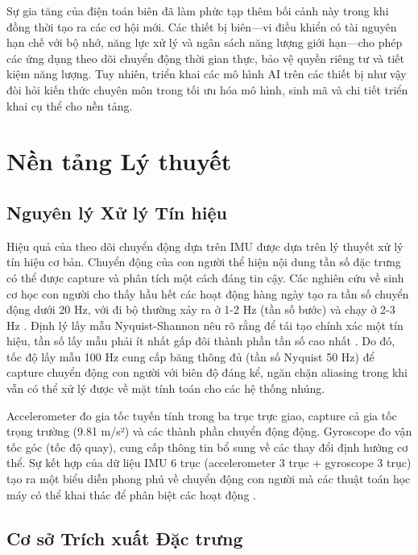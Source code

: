 Sự gia tăng của điện toán biên đã làm phức tạp thêm bối cảnh này trong khi đồng thời tạo ra các cơ hội mới. Các thiết bị biên—vi điều khiển có tài nguyên hạn chế với bộ nhớ, năng lực xử lý và ngân sách năng lượng giới hạn—cho phép các ứng dụng theo dõi chuyển động thời gian thực, bảo vệ quyền riêng tư và tiết kiệm năng lượng. Tuy nhiên, triển khai các mô hình AI trên các thiết bị như vậy đòi hỏi kiến thức chuyên môn trong tối ưu hóa mô hình, sinh mã và chi tiết triển khai cụ thể cho nền tảng.

\section{Nền tảng Lý thuyết}

\subsection{Nguyên lý Xử lý Tín hiệu}

Hiệu quả của theo dõi chuyển động dựa trên IMU được dựa trên lý thuyết xử lý tín hiệu cơ bản. Chuyển động của con người thể hiện nội dung tần số đặc trưng có thể được capture và phân tích một cách đáng tin cậy. Các nghiên cứu về sinh cơ học con người cho thấy hầu hết các hoạt động hàng ngày tạo ra tần số chuyển động dưới 20 Hz, với đi bộ thường xảy ra ở 1-2 Hz (tần số bước) và chạy ở 2-3 Hz \cite{whittle2014gait}. Định lý lấy mẫu Nyquist-Shannon nêu rõ rằng để tái tạo chính xác một tín hiệu, tần số lấy mẫu phải ít nhất gấp đôi thành phần tần số cao nhất \cite{oppenheim1999discrete}. Do đó, tốc độ lấy mẫu 100 Hz cung cấp băng thông đủ (tần số Nyquist 50 Hz) để capture chuyển động con người với biên độ đáng kể, ngăn chặn aliasing trong khi vẫn có thể xử lý được về mặt tính toán cho các hệ thống nhúng.

Accelerometer đo gia tốc tuyến tính trong ba trục trực giao, capture cả gia tốc trọng trường (9.81 m/s²) và các thành phần chuyển động động. Gyroscope đo vận tốc góc (tốc độ quay), cung cấp thông tin bổ sung về các thay đổi định hướng cơ thể. Sự kết hợp của dữ liệu IMU 6 trục (accelerometer 3 trục + gyroscope 3 trục) tạo ra một biểu diễn phong phú về chuyển động con người mà các thuật toán học máy có thể khai thác để phân biệt các hoạt động \cite{filippeschi2017survey_imu}.

\subsection{Cơ sở Trích xuất Đặc trưng}

